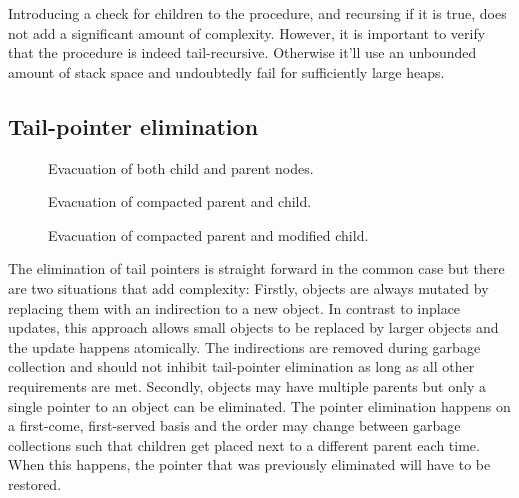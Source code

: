 \documentclass[a4paper,oneside]{memoir}
\begin{document}
Introducing a check for children to the procedure, and recursing if it is true,
does not add a significant amount of complexity. However, it is important to
verify that the procedure is indeed tail-recursive. Otherwise it'll use an
unbounded amount of stack space and undoubtedly fail for sufficiently large
heaps.


\subsection{Tail-pointer elimination}

\begin{figure}[t]
  
  \caption{Evacuation of both child and parent nodes.}
  \label{parent_child}
\end{figure}

\begin{figure}[b]
  
  \caption{Evacuation of compacted parent and child.}
  \label{compacted_parent_child}
\end{figure}

\begin{figure}[t]
  
  \caption{Evacuation of compacted parent and modified child.}
  \label{modified_child}
\end{figure}

The elimination of tail pointers is straight forward in the common case but there
are two situations that add complexity: Firstly, objects are always mutated by
replacing them with an indirection to a new object. In contrast to inplace updates,
this approach allows small objects to be replaced by larger objects and the update
happens atomically. The indirections are removed during garbage collection
and should not inhibit tail-pointer elimination as long as all other requirements
are met.
Secondly, objects may have multiple parents but only a single pointer to an object
can be eliminated. The pointer elimination happens on a first-come, first-served
basis and the order may change between garbage collections such that children get
placed next to a different parent each time. When this happens, the pointer
that was previously eliminated will have to be restored.
\end{document}
